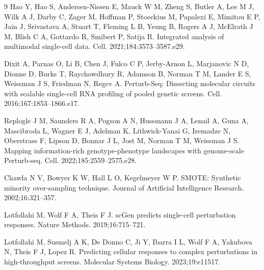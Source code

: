 \documentclass[preprint,12pt,number]{elsarticle}
\begin{document}
\begin{thebibliography}{9}
Hao Y, Hao S, Andersen-Nissen E, Mauck W M, Zheng S, Butler A, Lee M J, Wilk A J, Darby C, Zager M, Hoffman P, Stoeckius M, Papalexi E, Mimitou E P, Jain J, Srivastava A, Stuart T, Fleming L B, Yeung B, Rogers A J, McElrath J M, Blish C A, Gottardo R, Smibert P, Satija R. Integrated analysis of multimodal single-cell data. Cell. 2021;184:3573--3587.e29.

Dixit A, Parnas O, Li B, Chen J, Fulco C P, Jerby-Arnon L, Marjanovic N D, Dionne D, Burks T, Raychowdhury R, Adamson B, Norman T M, Lander E S, Weissman J S, Friedman N, Regev A. Perturb-Seq: Dissecting molecular circuits with scalable single-cell RNA profiling of pooled genetic screens. Cell. 2016;167:1853--1866.e17.

Replogle J M, Saunders R A, Pogson A N, Hussmann J A, Lenail A, Guna A, Mascibroda L, Wagner E J, Adelman K, Lithwick-Yanai G, Iremadze N, Oberstrass F, Lipson D, Bonnar J L, Jost M, Norman T M, Weissman J S. Mapping information-rich genotype-phenotype landscapes with genome-scale Perturb-seq. Cell. 2022;185:2559--2575.e28.

Chawla N V, Bowyer K W, Hall L O, Kegelmeyer W P. SMOTE: Synthetic minority over-sampling technique. Journal of Artificial Intelligence Research. 2002;16:321--357.

Lotfollahi M, Wolf F A, Theis F J. scGen predicts single-cell perturbation responses. Nature Methods. 2019;16:715--721.

Lotfollahi M, Susmelj A K, De Donno C, Ji Y, Ibarra I L, Wolf F A, Yakubova N, Theis F J, Lopez R. Predicting cellular responses to complex perturbations in high-throughput screens. Molecular Systems Biology. 2023;19:e11517.
\end{thebibliography}
\end{document}
